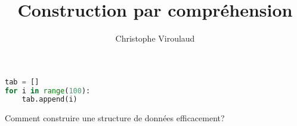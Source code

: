 \documentclass[svgnames,11pt]{beamer}
\author[]{Christophe Viroulaud}
\title{Construction par compréhension}
\date{\framebox{\textbf{DonRep 11}}}
\institute{Première - NSI}
\begin{document}
\begin{frame}
\titlepage
\end{frame}
\begin{frame}[fragile]
    \frametitle{}

\begin{center}
\begin{lstlisting}[language=Python , basicstyle=\ttfamily\small, xleftmargin=2em, xrightmargin=2em]
tab = []
for i in range(100):
    tab.append(i)
\end{lstlisting}
\label{CODE}
\end{center}   

\begin{framed}\centering
    Comment construire une structure de données efficacement?
\end{framed}
\end{frame}
\end{document}
